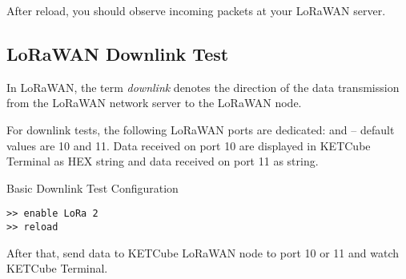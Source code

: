 After reload, you should observe incoming packets at your LoRaWAN server.

\subsection{LoRaWAN Downlink Test}
In LoRaWAN, the term {\it downlink} denotes the direction of the data transmission from the LoRaWAN network server to the LoRaWAN node.

For downlink tests, the following LoRaWAN ports are dedicated:\break {} and  -- default values are 10 and 11. Data received on port 10 are displayed in KETCube Terminal as HEX string and data received on port 11 as string.

\begin{docCodeExampleTitled}{Basic Downlink Test Configuration}
\begin{verbatim}
>> enable LoRa 2
>> reload
\end{verbatim}
\end{docCodeExampleTitled}

After that, send data to KETCube LoRaWAN node to port 10 or 11 and watch KETCube Terminal.



\clearpage





